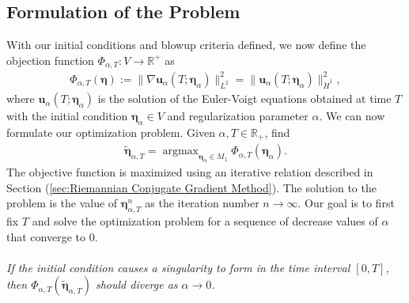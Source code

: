 \documentclass[12pt]{article}
\def\hdo{\dot{H}^1}
\def\pat{\Phi_{\alpha,T}}
\def\ua{\boldsymbol u_\alpha}
\def\be{\boldsymbol \eta}
\def\bea{\boldsymbol \eta_\alpha}
\def\RR{\mathbb{R}}
\DeclareMathOperator*{\argmax}{argmax}
\numberwithin{equation}{section}
\begin{document}
\subsection{Formulation of the Problem}
With our initial conditions and blowup criteria defined, we now define the objection function $\pat: V\rightarrow \RR^+$ as
\begin{align}\label{eq:objective:functional}
\pat(\be) := \|\nabla \ua(T;\bea)\|_{L^2}^2 = \|\ua(T;\bea)\|_{\hdo}^2,
\end{align}
where $\ua(T;\bea)$ is the solution of the Euler-Voigt equations obtained at time $T$ with the initial condition $\bea\in V$ and regularization parameter $\alpha$. We can now formulate our optimization problem. Given $\alpha, T\in\mathbb{R}_+$, find
\begin{align}
\tilde{\be}_{\alpha,T} = \argmax_{\bea \in M_1}\pat(\bea).
\end{align}
The objective function is maximized using an iterative relation described in Section (\ref{sec:Riemannian Conjugate Gradient Method}). The solution to the problem is the value of $\be_{\alpha,T}^n$ as the iteration number $n\rightarrow \infty$. Our goal is to first fix $T$ and solve the optimization problem for a sequence of decrease values of $\alpha$ that converge to 0. 
\\~\\
\textit{If the initial condition causes a singularity to form in the time interval $[0,T]$, then $\pat({\tilde{\be}_{\alpha,T}})$ should diverge as $\alpha\rightarrow 0$.} 
\end{document}
